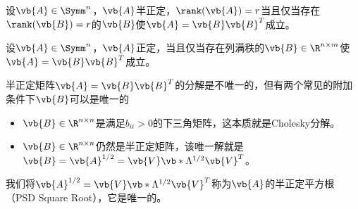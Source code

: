 \begin{BoxCorollary}[半正定矩阵分解的推论2]
    设$\vb{A}\in\Symm^n$，$\vb{A}$半正定，$\rank(\vb{A})=r$当且仅当存在$\rank(\vb{B})=r$的$\vb{B}$使$\vb{A}=\vb{B}\vb{B}^T$成立。
\end{BoxCorollary}

\begin{BoxCorollary}[半正定矩阵分解的推论3]
    设$\vb{A}\in\Symm^n$，$\vb{A}$正定，当且仅当存在列满秩的$\vb{B}\in\R^{n\times m}$使$\vb{A}=\vb{B}\vb{B}^T$成立。
\end{BoxCorollary}

半正定矩阵$\vb{A}=\vb{B}\vb{B}^T$的分解是不唯一的，但有两个常见的附加条件下$\vb{B}$可以是唯一的
\begin{itemize}
    \item $\vb{B}\in\R^{n\times n}$是满足$b_{ii}>0$的下三角矩阵，这本质就是Cholesky分解。
    \item $\vb{B}\in\R^{n\times n}$仍然是半正定矩阵，该唯一解就是$\vb{B}=\vb{A}^{1/2}=\vb{V}\vb*{\Lambda}^{1/2}\vb{V}^T$。
\end{itemize}

我们将$\vb{A}^{1/2}=\vb{V}\vb*{\Lambda}^{1/2}\vb{V}^T$称为$\vb{A}$的半正定平方根（PSD Square Root），它是唯一的。
